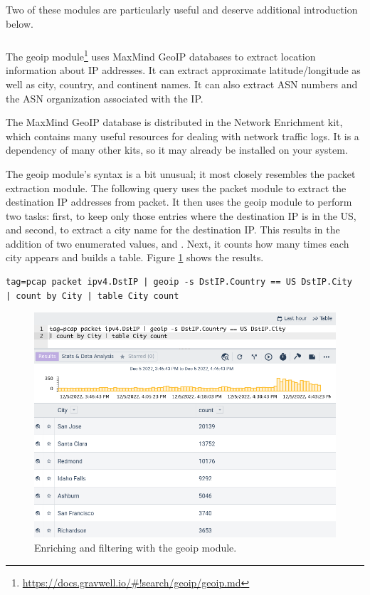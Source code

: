 Two of these modules are particularly useful and deserve additional introduction below.

\subsubsection{\emph{}}

The geoip module\footnote{\href{https://docs.gravwell.io/\#!search/geoip/geoip.md}{https://docs.gravwell.io/\#!search/geoip/geoip.md}} uses MaxMind GeoIP databases to extract location information about IP addresses. It can extract approximate latitude/longitude as well as city, country, and continent names. It can also extract ASN numbers and the ASN organization associated with the IP.

The MaxMind GeoIP database is distributed in the Network Enrichment kit, which contains many useful resources for dealing with network traffic logs. It is a dependency of many other kits, so it may already be installed on your system.

The geoip module's syntax is a bit unusual; it most closely resembles the packet extraction module. The following query uses the packet module to extract the destination IP addresses from packet. It then uses the geoip module to perform two tasks: first, to keep only those entries where the destination IP is in the US, and second, to extract a city name for the destination IP. This results in the addition of two enumerated values,  and . Next, it counts how many times each city appears and builds a table. Figure \ref{fig:geoip1} shows the results.

\begin{verbatim}
tag=pcap packet ipv4.DstIP | geoip -s DstIP.Country == US DstIP.City 
| count by City | table City count
\end{verbatim}

\begin{figure}
	\includegraphics[width=0.8\linewidth]{images/geoip1.png}
	\caption{Enriching and filtering with the geoip module.}
	\label{fig:geoip1}
\end{figure}


